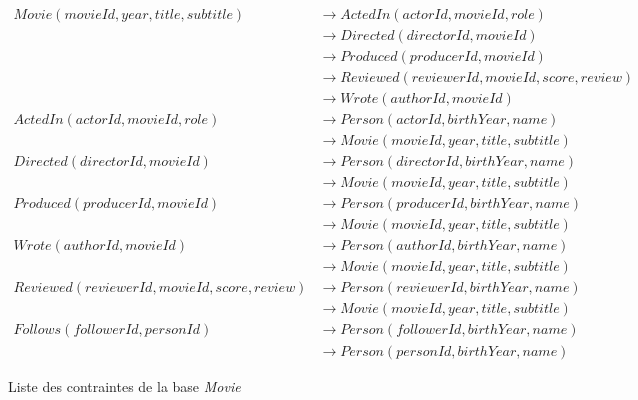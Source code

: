 \begin{figure}[H]
    \centering
    \begin{adjustbox}{max width=\linewidth, max height=.5\textheight}
        \parbox{\linewidth}{\begin{align*}
                Movie(movieId, year, title, subtitle)        & \to  ActedIn(actorId, movieId, role)              \\
                                                             & \to  Directed(directorId, movieId)                \\
                                                             & \to  Produced(producerId, movieId)                \\
                                                             & \to  Reviewed(reviewerId, movieId, score, review) \\
                                                             & \to Wrote(authorId, movieId)                      \\
                ActedIn(actorId, movieId, role)              & \to Person(actorId, birthYear, name)              \\
                                                             & \to Movie(movieId, year, title, subtitle)         \\
                Directed(directorId, movieId)                & \to  Person(directorId, birthYear, name)          \\
                                                             & \to  Movie(movieId, year, title, subtitle)        \\
                Produced(producerId, movieId)                & \to  Person(producerId, birthYear, name)          \\
                                                             & \to  Movie(movieId, year, title, subtitle)        \\
                Wrote(authorId, movieId)                     & \to  Person(authorId, birthYear, name)            \\
                                                             & \to  Movie(movieId, year, title, subtitle)        \\
                Reviewed(reviewerId, movieId, score, review) & \to  Person(reviewerId, birthYear, name)          \\
                                                             & \to  Movie(movieId, year, title, subtitle)        \\
                Follows(followerId, personId)                & \to  Person(followerId, birthYear, name)          \\
                                                             & \to  Person(personId, birthYear, name)
            \end{align*}}
    \end{adjustbox}
    \caption{Liste des contraintes de la base \emph{Movie}}
\end{figure}

